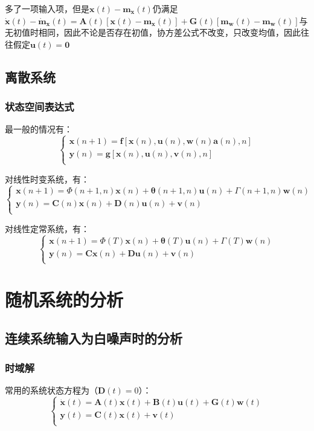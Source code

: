 \documentclass[11pt,a4paper]{ctexart}
\begin{document}
            多了一项输入项，但是$\bm{x}(t)-\bm{m_x}(t)$仍满足$\bm{\dot x}(t)-\bm{\dot m_x}(t)=\bm{A}(t)[\bm{x}(t)-\bm{m_x}(t)]+\bm{G}(t)[\bm{m_w}(t)-\bm{m_w}(t)]$与无初值时相同，因此不论是否存在初值，协方差公式不改变，只改变均值，因此往往假定$\bm{u}(t)=\bm{0}$
    \subsection{离散系统}
        \subsubsection{状态空间表达式}
            最一般的情况有：
            \[
            \begin{cases}
            \bm{x}(n+1)=\bm{f}[\bm{x}(n),\bm{u}(n),\bm{w}(n)\bm{a}(n),n]\\
            \bm{y}(n)=\bm{g}[\bm{x}(n),\bm{u}(n),\bm{v}(n),n]\\
            \end{cases}
            \]
            
            对线性时变系统，有：
            \[
            \begin{cases}
            \bm{x}(n+1)=\bm{\varPhi}(n+1,n)\bm{x}(n)+\bm{\theta}(n+1,n)\bm{u}(n)+\bm{\varGamma}(n+1,n)\bm{w}(n)\\
            \bm{y}(n)=\bm{C}(n)\bm{x}(n)+\bm{D}(n)\bm{u}(n)+\bm{v}(n)\\
            \end{cases}
            \]

            对线性定常系统，有：
            \[
            \begin{cases}
            \bm{x}(n+1)=\bm{\varPhi}(T)\bm{x}(n)+\bm{\theta}(T)\bm{u}(n)+\bm{\varGamma}(T)\bm{w}(n)\\
            \bm{y}(n)=\bm{Cx}(n)+\bm{Du}(n)+\bm{v}(n)\\
            \end{cases}
            \]
\newpage
\section{随机系统的分析}
    \subsection{连续系统输入为白噪声时的分析}
        \subsubsection{时域解}
            常用的系统状态方程为（$\bm{D}(t)=0$）：
            \[
            \begin{cases}
            \bm{\dot x}(t)=\bm{A}(t)\bm{x}(t)+\bm{B}(t)\bm{u}(t)+\bm{G}(t)\bm{w}(t)\\
            \bm{y}(t)=\bm{C}(t)\bm{x}(t)+\bm{v}(t)\\
            \end{cases}
            \]
\end{document}
